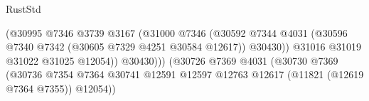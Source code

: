 \begin{lexlean}{RustStd}
\begin{coremodule}
                                                          (@30995
                                                            @7346
                                                            @3739
                                                            @3167
                                                            (@31000
                                                              @7346
                                                              (@30592
                                                                @7344
                                                                @4031
                                                                (@30596
                                                                  @7340
                                                                  @7342
                                                                  (@30605
                                                                    @7329
                                                                    @4251
                                                                    @30584
                                                                    @12617))
                                                                @30430))
                                                            @31016
                                                            @31019
                                                            @31022
                                                            @31025
                                                            @12054))
                                                        @30430)))
                                                  (@30726
                                                    @7369
                                                    @4031
                                                    (@30730
                                                      @7369
                                                      (@30736
                                                        @7354
                                                        @7364
                                                        @30741
                                                        @12591
                                                        @12597
                                                        @12763
                                                        @12617
                                                        (@11821 (@12619 @7364 @7355))
                                                        @12054))

\end{coremodule}
\end{lexlean}
